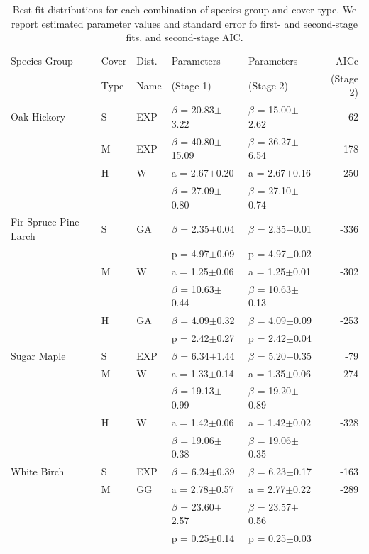 \message{ !name(pspdistfit_article.tex)}\documentclass{article}
\begin{document}
\begin{table}
\caption{Best-fit distributions for each combination of species group
  and cover type. We report estimated parameter values and standard
  error fo first- and second-stage fits, and second-stage AIC.}
\label{tab:results}
{\footnotesize
\begin{tabular}{lllllr}
\toprule
Species Group & Cover & Dist. & Parameters & Parameters & AICc \\
& Type & Name & (Stage 1) & (Stage 2) & (Stage 2) \\
\midrule
Oak-Hickory & S & EXP & $\beta$ = 20.83$\pm$3.22 & $\beta$ = 15.00$\pm$2.62 & -62 \\
 & M & EXP & $\beta$ = 40.80$\pm$15.09 & $\beta$ = 36.27$\pm$6.54 & -178 \\
 & H & W & a = 2.67$\pm$0.20 & a = 2.67$\pm$0.16 & -250 \\
 &  &  & $\beta$ = 27.09$\pm$0.80 & $\beta$ = 27.10$\pm$0.74 &  \\
Fir-Spruce-Pine-Larch & S & GA & $\beta$ = 2.35$\pm$0.04 & $\beta$ = 2.35$\pm$0.01 & -336 \\
 &  &  & p = 4.97$\pm$0.09 & p = 4.97$\pm$0.02 &  \\
 & M & W & a = 1.25$\pm$0.06 & a = 1.25$\pm$0.01 & -302 \\
 &  &  & $\beta$ = 10.63$\pm$0.44 & $\beta$ = 10.63$\pm$0.13 &  \\
 & H & GA & $\beta$ = 4.09$\pm$0.32 & $\beta$ = 4.09$\pm$0.09 & -253 \\
 &  &  & p = 2.42$\pm$0.27 & p = 2.42$\pm$0.04 &  \\
Sugar Maple & S & EXP & $\beta$ = 6.34$\pm$1.44 & $\beta$ = 5.20$\pm$0.35 & -79 \\
 & M & W & a = 1.33$\pm$0.14 & a = 1.35$\pm$0.06 & -274 \\
 &  &  & $\beta$ = 19.13$\pm$0.99 & $\beta$ = 19.20$\pm$0.89 &  \\
 & H & W & a = 1.42$\pm$0.06 & a = 1.42$\pm$0.02 & -328 \\
 &  &  & $\beta$ = 19.06$\pm$0.38 & $\beta$ = 19.06$\pm$0.35 &  \\
White Birch & S & EXP & $\beta$ = 6.24$\pm$0.39 & $\beta$ = 6.23$\pm$0.17 & -163 \\
 & M & GG & a = 2.78$\pm$0.57 & a = 2.77$\pm$0.22 & -289 \\
 &  &  & $\beta$ = 23.60$\pm$2.57 & $\beta$ = 23.57$\pm$0.56 &  \\
 &  &  & p = 0.25$\pm$0.14 & p = 0.25$\pm$0.03 &  \\

\end{tabular}}
\end{table}
\end{document}
